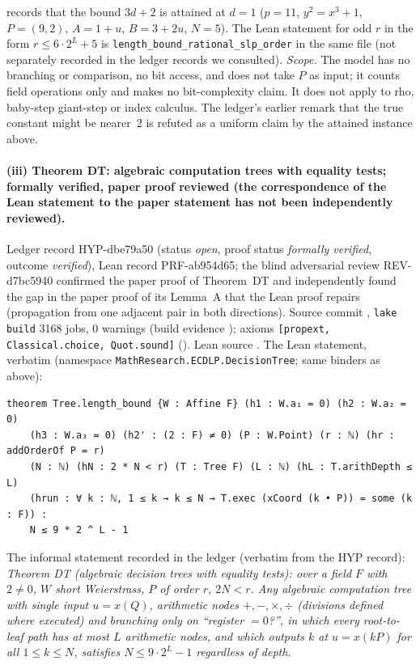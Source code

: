 \documentclass[11pt,a4paper]{article}
\theoremstyle{remark}
\begin{document}
records that the bound $3d+2$ is attained at $d=1$ ($p=11$, $y^2=x^3+1$, $P=(9,2)$, $A=1+u$, $B=3+2u$, $N=5$). The Lean statement for odd $r$ in the form $r\le 6\cdot2^{L}+5$ is \texttt{length\_bound\_rational\_slp\_order} in the same file (not separately recorded in the ledger records we consulted).
\emph{Scope.} The model has no branching or comparison, no bit access, and does not take $P$ as input; it counts field operations only and makes no bit-complexity claim. It does not apply to rho, baby-step giant-step or index calculus.
The ledger's earlier remark that the true constant might be nearer~$2$ is refuted as a uniform claim by the attained instance above.

\paragraph{(iii) Theorem DT: algebraic computation trees with equality tests; formally verified, paper proof reviewed (the correspondence of the Lean statement to the paper statement has not been independently reviewed).}
Ledger record \mbox{HYP-dbe79a50} (status \emph{open}, proof status \emph{formally verified}, outcome \emph{verified}), Lean record \mbox{PRF-ab954d65}; the blind adversarial review \mbox{REV-d7bc5940}
confirmed the paper proof of Theorem~DT and independently found the gap in the paper proof of its Lemma~A that the Lean proof repairs (propagation from one adjacent pair in both directions). Source commit , \texttt{lake build} 3168 jobs, 0 warnings
(build evidence );
axioms \texttt{[propext, Classical.choice, Quot.sound]} ().
Lean source . The Lean statement, verbatim (namespace \texttt{MathResearch.ECDLP.DecisionTree}; same binders as above):
\begin{lstlisting}
theorem Tree.length_bound {W : Affine F} (h1 : W.a₁ = 0) (h2 : W.a₂ = 0)
    (h3 : W.a₃ = 0) (h2' : (2 : F) ≠ 0) (P : W.Point) (r : ℕ) (hr : addOrderOf P = r)
    (N : ℕ) (hN : 2 * N < r) (T : Tree F) (L : ℕ) (hL : T.arithDepth ≤ L)
    (hrun : ∀ k : ℕ, 1 ≤ k → k ≤ N → T.exec (xCoord (k • P)) = some (k : F)) :
    N ≤ 9 * 2 ^ L - 1
\end{lstlisting}
The informal statement recorded in the ledger (verbatim from the HYP record): \emph{Theorem DT (algebraic decision trees with equality tests): over a field $F$ with $2\ne0$, $W$ short Weierstrass,
$P$ of order $r$, $2N<r$. Any algebraic computation tree with single input $u=x(Q)$, arithmetic nodes $+,-,\times,\div$ (divisions defined where executed) and branching only on ``register $=0$?'', in which every root-to-leaf path has at most $L$ arithmetic nodes, and which outputs $k$ at $u=x(kP)$ for all $1\le k\le N$, satisfies $N\le 9\cdot 2^L-1$ regardless of depth.}
\end{document}
